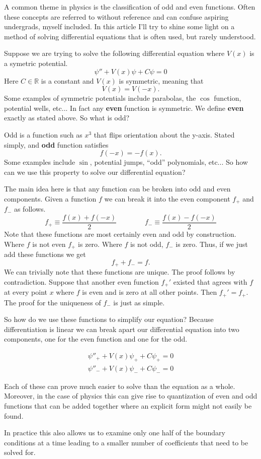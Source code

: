 \documentclass[10pt]{article}
\begin{document}
A common theme in physics is the classification of odd and even functions. Often these concepts are referred to without reference and can confuse aspiring undergrads, myself included. In this article I'll try to shine some light on a method of solving differential equations that is often used, but rarely understood. 

Suppose we are trying to solve the following differential equation where $V(x)$ is a symetric potential.
\[
  \psi'' + V(x)\psi + C\psi = 0
\]
Here $C \in \mathbb{R}$ is a constant and $V(x)$ is symmetric, meaning that 
\[
  V(x) = V(-x).
\] 
Some examples of symmetric potentials include parabolas, the $\cos$ function, potential wells, etc... In fact any \textbf{even} function is symmetric. We define \textbf{even} exactly as stated above. So what is odd? 

Odd is a function such as $x^3$ that flips orientation about the y-axis. Stated simply, and \textbf{odd} function satisfies 
\[
  f(-x) = -f(x).
\]
Some examples include $\sin$, potential jumps, ``odd'' polynomials, etc... So how can we use this property to solve our differential equation? 

The main idea here is that any function can be broken into odd and even components. Given a function $f$ we can break it into the even component $f_+$ and $f_-$ as follows.
\[
  f_+ \equiv \frac{f(x) + f(-x)}{2} \qquad\qquad 
 f_- \equiv \frac{f(x) - f(-x)}{2}
\]
Note that these functions are most certainly even and odd by construction. Where $f$ is not even $f_+$ is zero. Where $f$ is not odd, $f_-$ is zero. Thus, if we just add these functions we get 
\[
  f_+ + f_- = f.
\]
We can trivially note that these functions are unique. The proof follows by contradiction. Suppose that another even function $f_+'$ existed that agrees with $f$ at every point $x$ where $f$ is even and is zero at all other points. Then $f_+' = f_+$. The proof for the uniqueness of $f_-$ is just as simple. 

So how do we use these functions to simplify our equation? Because differentiation is linear we can break apart our differential equation into two components, one for the even function and one for the odd. 

\begin{gather*}
  \psi''_+ + V(x)\psi_+ + C\psi_+ = 0 \\
  \psi''_- + V(x)\psi_- + C\psi_- = 0
\end{gather*}

Each of these can prove much easier to solve than the equation as a whole. Moreover, in the case of physics this can give rise to quantization of even and odd functions that can be added together where an explicit form might not easily be found. 

In practice this also allows us to examine only one half of the boundary conditions at a time leading to a smaller number of coefficients that need to be solved for. 
\end{document}
